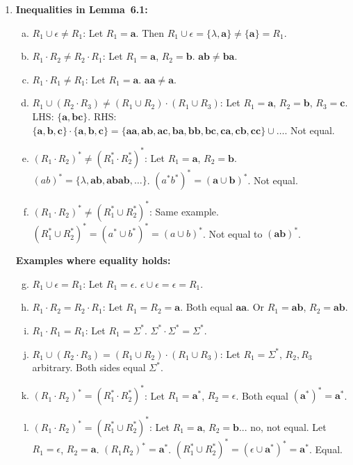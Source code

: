 \begin{enumerate}[{6.}1.]
\item \textbf{Inequalities in Lemma~6.1:}

\begin{enumerate}[(a)]
  \item $R_1\cup\epsilon\neq R_1$: Let $R_1=\pmb{a}$.  Then $R_1\cup\epsilon=\{\lambda,\pmb{a}\}\neq\{\pmb{a}\}=R_1$.
  \item $R_1\cdot R_2\neq R_2\cdot R_1$: Let $R_1=\pmb{a}$, $R_2=\pmb{b}$.  $\pmb{ab}\neq\pmb{ba}$.
  \item $R_1\cdot R_1\neq R_1$: Let $R_1=\pmb{a}$.  $\pmb{aa}\neq\pmb{a}$.
  \item $R_1\cup(R_2\cdot R_3)\neq(R_1\cup R_2)\cdot(R_1\cup R_3)$: Let $R_1=\pmb{a}$, $R_2=\pmb{b}$, $R_3=\pmb{c}$.  LHS: $\{\pmb{a},\pmb{bc}\}$.  RHS: $\{\pmb{a},\pmb{b},\pmb{c}\}\cdot\{\pmb{a},\pmb{b},\pmb{c}\}=\{\pmb{aa},\pmb{ab},\pmb{ac},\pmb{ba},\pmb{bb},\pmb{bc},\pmb{ca},\pmb{cb},\pmb{cc}\}\cup\ldots$.  Not equal.
  \item $(R_1\cdot R_2)^*\neq(R_1^*\cdot R_2^*)^*$: Let $R_1=\pmb{a}$, $R_2=\pmb{b}$.  $(ab)^*=\{\lambda,\pmb{ab},\pmb{abab},\ldots\}$.  $(a^*b^*)^*=(\pmb{a}\cup\pmb{b})^*$.  Not equal.
  \item $(R_1\cdot R_2)^*\neq(R_1^*\cup R_2^*)^*$: Same example.  $(R_1^*\cup R_2^*)^*=(a^*\cup b^*)^*=(a\cup b)^*$.  Not equal to $(\pmb{ab})^*$.
\end{enumerate}

\textbf{Examples where equality holds:}
\begin{enumerate}[(a)]
  \setcounter{enumii}{6}
  \item $R_1\cup\epsilon=R_1$: Let $R_1=\epsilon$.  $\epsilon\cup\epsilon=\epsilon=R_1$.
  \item $R_1\cdot R_2=R_2\cdot R_1$: Let $R_1=R_2=\pmb{a}$.  Both equal $\pmb{aa}$.  Or $R_1=\pmb{ab}$, $R_2=\pmb{ab}$.
  \item $R_1\cdot R_1=R_1$: Let $R_1=\Sigma^*$.  $\Sigma^*\cdot\Sigma^*=\Sigma^*$.
  \item $R_1\cup(R_2\cdot R_3)=(R_1\cup R_2)\cdot(R_1\cup R_3)$: Let $R_1=\Sigma^*$, $R_2,R_3$ arbitrary.  Both sides equal $\Sigma^*$.
  \item $(R_1\cdot R_2)^*=(R_1^*\cdot R_2^*)^*$: Let $R_1=\pmb{a}^*$, $R_2=\epsilon$.  Both equal $(\pmb{a}^*)^*=\pmb{a}^*$.
  \item $(R_1\cdot R_2)^*=(R_1^*\cup R_2^*)^*$: Let $R_1=\pmb{a}$, $R_2=\pmb{b}$... no, not equal.  Let $R_1=\epsilon$, $R_2=\pmb{a}$.  $(R_1R_2)^*=\pmb{a}^*$.  $(R_1^*\cup R_2^*)^*=(\epsilon\cup\pmb{a}^*)^*=\pmb{a}^*$.  Equal.
\end{enumerate}


\end{enumerate}
